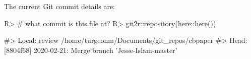 \documentclass[
]{jss}
\begin{document}
The current Git commit details are:

\begin{CodeChunk}

\begin{CodeInput}
R> # what commit is this file at? 
R> git2r::repository(here::here())
\end{CodeInput}

\begin{CodeOutput}
#> Local:    review /home/turgeonm/Documents/git_repos/cbpaper
#> Head:     [8804f68] 2020-02-21: Merge branch 'Jesse-Islam-master'
\end{CodeOutput}
\end{CodeChunk}


\end{document}
